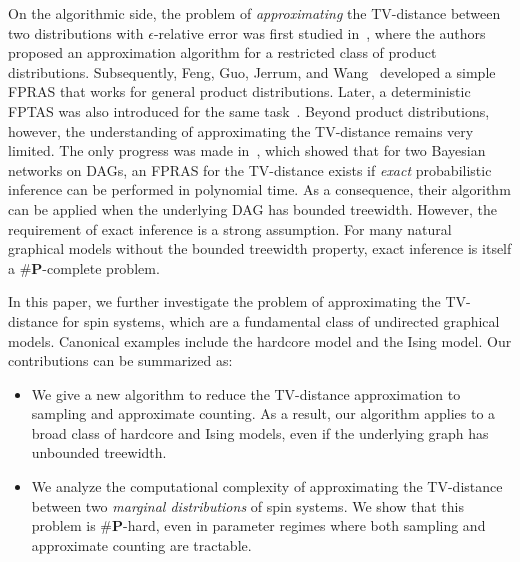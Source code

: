 On the algorithmic side, the problem of \emph{approximating} the TV-distance between two distributions with \(\epsilon\)-relative error was first studied in~\cite{0001GMMPV23}, where the authors proposed an approximation algorithm for a restricted class of product distributions. Subsequently, Feng, Guo, Jerrum, and Wang~\cite{FGJW23} developed a simple FPRAS that works for general product distributions. Later, a deterministic FPTAS was also introduced for the same task~\cite{FengLL24}.
Beyond product distributions, however, the understanding of approximating the TV-distance remains very limited. The only progress was made in~\cite{0001GMM0V24}, which showed that for two Bayesian networks on DAGs, an FPRAS for the TV-distance exists if \emph{exact} probabilistic inference can be performed in polynomial time. As a consequence, their algorithm can be applied when the underlying DAG has bounded treewidth. 
However, the requirement of exact inference is a strong assumption. For many natural graphical models without the bounded treewidth property, exact inference is itself a \(\textbf{\#P}\)-complete problem.



In this paper, we further investigate the problem of approximating the TV-distance for spin systems, which are a fundamental class of undirected graphical models. Canonical examples include the hardcore model and the Ising model. Our contributions can be summarized as:

\begin{itemize}
    \item We give a new algorithm to reduce the TV-distance approximation to sampling and approximate counting. 
    As a result, our algorithm applies to a broad class of hardcore and Ising models, even if the underlying graph has unbounded treewidth.
    \item We analyze the computational complexity of approximating the TV-distance between two \emph{marginal distributions} of spin systems. We show that this problem is \(\textbf{\#P}\)-hard, even in parameter regimes where both sampling and approximate counting are tractable.
\end{itemize}

%
%












